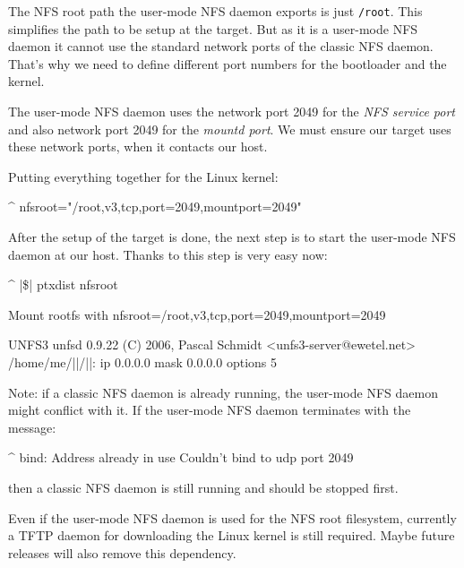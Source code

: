The NFS root path the user-mode NFS daemon exports is just \texttt{/root}. This
simplifies the path to be setup at the target. But as it is a user-mode NFS
daemon it cannot use the standard network ports of the classic NFS daemon. That's
why we need to define different port numbers for the bootloader and the kernel.

The user-mode NFS daemon uses the network port 2049 for the \textit{NFS service
port} and also network port 2049 for the \textit{mountd port}. We must ensure
our target uses these network ports, when it contacts our host.

Putting everything together for the Linux kernel:

\begin{ptxshell}[escapechar=|]{^}
nfsroot="/root,v3,tcp,port=2049,mountport=2049"
\end{ptxshell}

After the setup of the target is done, the next step is to start the user-mode
NFS daemon at our host. Thanks to \ptxdist{} this step is very easy now:

\begin{ptxshell}[escapechar=|]{^}
|\$| ptxdist nfsroot

Mount rootfs with nfsroot=/root,v3,tcp,port=2049,mountport=2049

UNFS3 unfsd 0.9.22 (C) 2006, Pascal Schmidt <unfs3-server@ewetel.net>
/home/me/|\ptxdistBSPName |/|\ptxdistPlatformDir |: ip 0.0.0.0 mask 0.0.0.0 options 5
\end{ptxshell}

Note: if a classic NFS daemon is already running, the user-mode NFS daemon might
conflict with it. If the user-mode NFS daemon terminates with the message:

\begin{ptxshell}[escapechar=|]{^}
bind: Address already in use
Couldn't bind to udp port 2049
\end{ptxshell}

then a classic NFS daemon is still running and should be stopped first.

\begin{important}
Even if the user-mode NFS daemon is used for the NFS root filesystem, currently
a TFTP daemon for downloading the Linux kernel is still required. Maybe future
releases will also remove this dependency.
\end{important}
